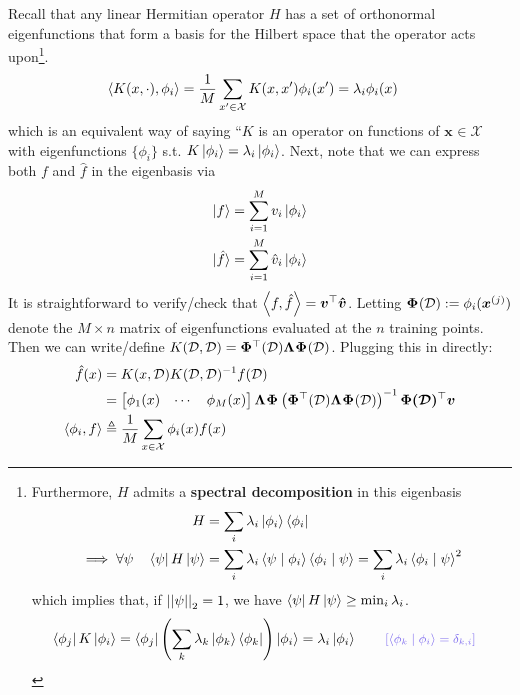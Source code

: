\documentclass{article}
\renewcommand\vec[2][]{\bm{#2}_{#1}}
\newcommand\mc{\mathcal}
\begin{document}
\begin{appendices}
Recall that any linear Hermitian operator $H$ has a set of orthonormal eigenfunctions that form a basis for the Hilbert space that the operator acts upon\footnote{Furthermore, $H$ admits a \textbf{spectral decomposition} in this eigenbasis
	\begin{align}
		H &= \sum_i \lambda_i \ket{\phi_i}\bra{\phi_i} \\
		\implies \forall \psi \quad 
		\bra{\psi} H \ket{\psi}
		&= \sum_i \lambda_i \braket{\psi \mid \phi_i}\braket{\phi_i \mid \psi} = \sum_i \lambda_i \braket{\phi_i \mid \psi}^2
	\end{align}
	which implies that, if $\left|\left| \psi \right|\right|_{2} = 1$, we have $\bra{\psi} H \ket{\psi} \geq \min_i \lambda_i$. 
	\begin{align}
		\bra{\phi_j} K \ket{\phi_i}
		&= \bra{\phi_j} \lr{ \sum_{k} \lambda_k \ket{\phi_k}\bra{\phi_k} } \ket{\phi_i} 
		= \lambda_i \ket{\phi_i} \qquad \mblue{[\braket{\phi_k \mid \phi_i} = \delta_{k,i}]}
	\end{align}
}. 
\begin{align}
	\innerprod{K(x, \cdot)}{\phi_i}
	&= \inv{M} \sum_{x' \in \mc X} K(x, x') \phi_i(x') 
	= \lambda_i \phi_i(x)
\end{align}
which is an equivalent way of saying ``$K$ is an operator on functions of $\vec x \in \mc X$ with eigenfunctions $\{\phi_i \}$ s.t. $K\ket{\phi_i} = \lambda_i \ket{\phi_i}$. Next, note that we can express both $f$ and $\hat f$ in the eigenbasis via 
\begin{align}
	\ket{f}
	&= \sum_{i = 1}^{M} v_i \ket{\phi_i} \\
	\ket{\hat f}
	&= \sum_{i = 1}^M \hat v_i \ket{\phi_i}
\end{align}
It is straightforward to verify/check that $\innerprod{f}{\hat f} = \vec{v}^\top \vec{\hat v}$. Letting $\matr\Phi(\mc D) := \phi_i(\ivec[j]{x})$ denote the $M \times n$ matrix of eigenfunctions evaluated at the $n$ training points. Then we can write/define $K(\mc D, \mc D) = \matr{\Phi}^\top(\mc D) \matr\Lambda \matr{\Phi}(\mc D)$. Plugging this in directly:
\begin{align}
	\hat f(x)
	&= K(x, \mc D) K(\mc D, \mc D)^{-1} f(\mc D) \\
	&= \begin{bmatrix} \phi_1(x) & \cdots & \phi_M(x) \end{bmatrix}
	\matr \Lambda \matr\Phi 
	\lr{\matr{\Phi}^\top(\mc D) \matr\Lambda \matr{\Phi}(\mc D)}^{-1} \matr{\Phi(\mc D)}^\top \vec v \\
	\innerprod{\phi_i}{f}
	&\triangleq \inv{M} \sum_{x \in \mc X} \phi_i(x) f(x) \\

\end{align}
\end{appendices}
\end{document}
